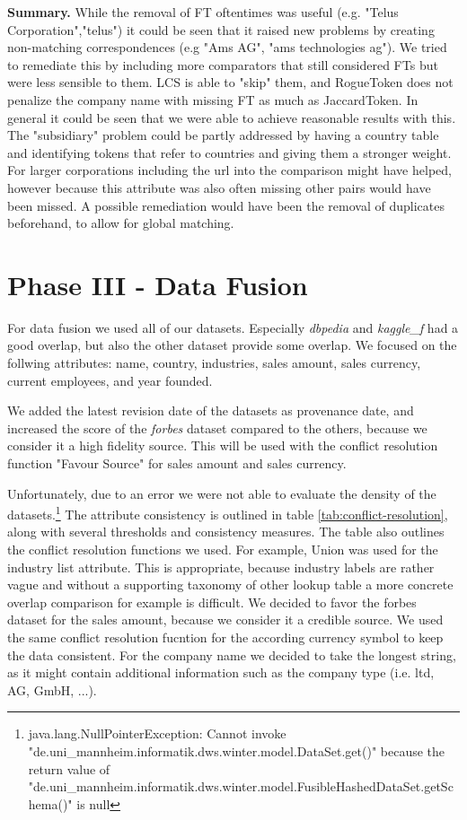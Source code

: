 \documentclass[11pt,titlepage,oneside,openany]{article}
\begin{document}
\textbf{Summary. }While the removal of FT oftentimes was useful (e.g. "Telus Corporation","telus") it could be seen that it raised new problems by creating non-matching correspondences (e.g "Ams AG", "ams technologies ag"). We tried to remediate this by including more comparators that still considered FTs but were less sensible to them. LCS is able to "skip" them, and RogueToken does not penalize the company name with missing FT as much as JaccardToken. In general it could be seen that we were able to achieve reasonable results with this. The "subsidiary" problem could be partly addressed by having a country table and identifying tokens that refer to countries and giving them a stronger weight. For larger corporations including the url into the comparison might have helped, however because this attribute was also often missing other pairs would have been missed. A possible remediation would have been the removal of duplicates beforehand, to allow for global matching.



\section{Phase III - Data Fusion}
\label{cha:data-fusion}

For data fusion we used all of our datasets. Especially \textit{dbpedia} and \textit{kaggle\_f} had a good overlap, but also the other dataset provide some overlap. We focused on the follwing attributes: name, country, industries, sales amount, sales currency, current employees, and year founded.

We added the latest revision date of the datasets as provenance date, and increased the score of the \textit{forbes} dataset compared to the others, because we consider it a high fidelity source. This will be used with the conflict resolution function "Favour Source" for sales amount and sales currency.

Unfortunately, due to an error we were not able to evaluate the density of the datasets.\footnote{java.lang.NullPointerException: Cannot invoke "de.uni\_mannheim.informatik.dws.winter.model.DataSet.get()" because the return value of "de.uni\_mannheim.informatik.dws.winter.model.FusibleHashedDataSet.getSchema()" is null}%
The attribute consistency is outlined in table \ref{tab:conflict-resolution}, along with several thresholds and consistency measures. The table also outlines the conflict resolution functions we used. For example, Union was used for the industry list attribute. This is appropriate, because industry labels are rather vague and without a supporting taxonomy of other lookup table a more concrete overlap comparison for example is difficult. We decided to favor the forbes dataset for the sales amount, because we consider it a credible source. We used the same conflict resolution fucntion for the according currency symbol to keep the data consistent. For the company name we decided to take the longest string, as it might contain additional information such as the company type (i.e. ltd, AG, GmbH, ...).
\end{document}
